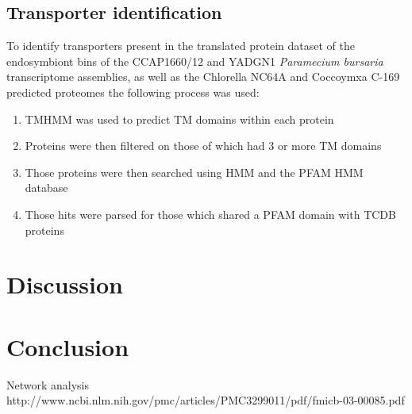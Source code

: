 \subsection{Transporter identification}

To identify transporters present in the translated protein dataset of the 
endosymbiont bins of the CCAP1660/12 and YADGN1 
\textit{Paramecium bursaria} transcriptome assemblies, as well as the Chlorella NC64A 
and Coccoymxa C-169 predicted proteomes the following process was used:

\begin{enumerate}
        \item TMHMM was used to predict TM domains within each protein
        \item Proteins were then filtered on those of which had 3 or more TM domains
        \item Those proteins were then searched using HMM and the PFAM HMM database
        \item Those hits were parsed for those which shared a PFAM domain with TCDB proteins
\end{enumerate}

\section{Discussion}

\section{Conclusion}


Network analysis
http://www.ncbi.nlm.nih.gov/pmc/articles/PMC3299011/pdf/fmicb-03-00085.pdf



